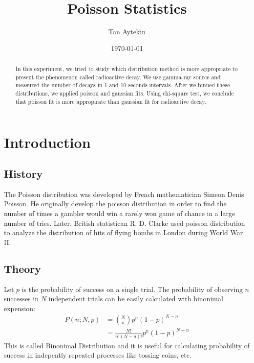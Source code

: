\documentclass[reprint,amsmath,aps,nofootinbib,english]{revtex4-2}
\begin{document}
\title{Poisson Statistics}
\author{Tan Aytekin}
\date{\today}


\begin{abstract}
In this experiment, we tried to study which distribution method is more appropriate to present the phenomenon called radioactive decay. We use gamma-ray source and measured the number of decays in 1 and 10 seconds intervals. After we binned these distributions, we applied poisson and gaussian fits. Using chi-square test, we conclude that poisson fit is more appropirate than gaussian fit for radioactive decay.
\end{abstract}

\maketitle

\section{Introduction}

\subsection{History}
The Poisson distribution was developed by French mathematician Simeon Denis Poisson. He originally develop the poisson distribution in order to find the number of times a gambler would win a rarely won game of chance in a large number of tries.\cite{bri} Later, British statistican R. D. Clarke used poisson distribution to analyze the distribution of hits of flying bombs in London during World War II.\cite{clarke_1946}


\subsection{Theory}
Let $p$ is the probability of success on a single trial. The probability of observing $n$ successes in $N$ independent trials can be easily calculated with binonimal expension:
\begin{align}
        P(n;N,p) &= \binom{N}{n} p^{n} (1-p)^{N-n} \\
                 &= \frac{N!}{n!(N-n)!} p^{n} (1-p)^{N-n}
\end{align}
This is called Binonimal Distribution and it is useful for calculating probability of success in indepently repeated processes like tossing coins, etc.\\
\end{document}
